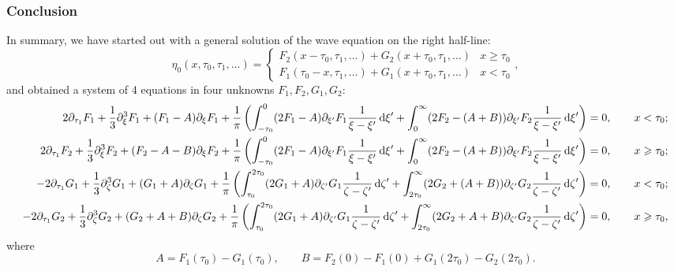 \documentclass[10pt,reqno,oneside,a4paper, landscape]{article}
\begin{document}
\subsubsection{Conclusion}
In summary, we have started out with a general solution of the wave equation on the right half-line:
\[ \eta_0(x, \tau_0, \tau_1, \ldots ) = \begin{cases} F_2(x-\tau_0, \tau_1, \ldots ) + G_2(x+\tau_0, \tau_1, \ldots) & x\geq \tau_0 \\ F_1(\tau_0-x, \tau_1, \ldots ) + G_1(x+\tau_0, \tau_1, \ldots) & x<\tau_0 \end{cases}, \]
and obtained a system of 4 equations in four unknowns $F_1, F_2, G_1, G_2:$
\begin{equation}\label{HLSystem}
\begin{aligned}
2 \partial_{\tau_1}F_1 + \frac{1}{3} \partial_\xi^3 F_1 + (F_1-A)\partial_\xi F_1 + \frac{1}{\pi} \left(\int^0_{-\tau_0} (2 F_1  - A)\partial_{\xi'} F_1\frac{1}{\xi -\xi'} \,\mathrm{d} \xi' + \int^{\infty}_{0} (2 F_2 - (A+B))\partial_{\xi'} F_2 \frac{1}{\xi -\xi'} \,\mathrm{d} \xi'\right)  &= 0, \qquad x < \tau_0; \\
2 \partial_{\tau_1}F_2 + \frac{1}{3} \partial_\xi^3 F_2 + (F_2-A-B)\partial_\xi F_2 + \frac{1}{\pi}  \left( \int^0_{-\tau_0} (2 F_1 -A)\partial_{\xi'}F_1\frac{1}{\xi -\xi'} \,\mathrm{d} \xi' + \int^{\infty}_{0} (2 F_2 -  (A+B))\partial_{\xi'} F_2 \frac{1}{\xi -\xi'} \,\mathrm{d} \xi'  \right) &= 0, \qquad x \geqslant \tau_0; \\
- 2 \partial_{\tau_1} G_1 +  \frac{1}{3} \partial_\zeta^3 G_1+ (G_1+A) \partial_{\zeta} G_1  +  \frac{1}{\pi} \left( \int^{2\tau_0}_{\tau_0} (2 G_1 + A) \partial_{\zeta'} G_1 \frac{1}{\zeta -\zeta'} \,\mathrm{d} \zeta' + \int^{\infty}_{2\tau_0} (2 G_2+(A+B)) \partial_{\zeta'} G_2 \frac{1}{\zeta -\zeta'} \,\mathrm{d} \zeta' \right) &= 0, \qquad x < \tau_0; \\
- 2 \partial_{\tau_1} G_2 +  \frac{1}{3} \partial_\zeta^3 G_2+ (G_2+ A +B)\partial_{\zeta} G_2  + \frac{1}{\pi}  \left( \int^{2\tau_0}_{\tau_0} (2 G_1 +A)\partial_{\zeta'} G_1 \frac{1}{\zeta -\zeta'} \,\mathrm{d} \zeta' + \int^{\infty}_{2\tau_0} (2 G_2+A+B) \partial_{\zeta'} G_2 \frac{1}{\zeta -\zeta'} \,\mathrm{d} \zeta' \right) &= 0, \qquad x \geqslant \tau_0,
\end{aligned}
\end{equation}
where 
\[ A = F_1(\tau_0)  - G_1(\tau_0), \qquad B = F_2(0) - F_1(0)  +  G_1(2\tau_0) - G_2(2\tau_0). \]
\end{document}
